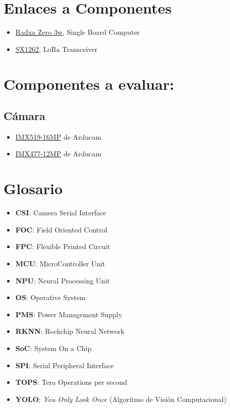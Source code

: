 \documentclass[letterpaper,11pt]{article}
\begin{document}
\newpage
\section*{Enlaces a Componentes}
\begin{itemize}
    \item \href{https://radxa.com/products/zeros/zero3w/#techspec}{Radxa Zero 3w}, Single Board Computer
    \item \href{https://www.semtech.com/products/wireless-rf/lora-connect/sx1262}{SX1262}, LoRa Transceiver
\end{itemize}

\section*{Componentes a evaluar:}
\subsection*{Cámara}
    \begin{itemize}
        \item \href{https://www.arducam.com/imx519-autofocus-camera-module-for-raspberry-pi-arducam-b0371.html}{IMX519-16MP} de Arducam
        \item \href{https://docs.arducam.com/Raspberry-Pi-Camera/Native-camera/12MP-IMX477/#supported-operating-systems}{IMX477-12MP} de Arducam
    \end{itemize}

\newpage
\section*{Glosario}
\begin{itemize}
    \item \textbf{CSI}: Camera Serial Interface
    \item \textbf{FOC}: Field Oriented Control
    \item \textbf{FPC}: Flexible Printed Circuit
    \item \textbf{MCU}: MicroController Unit
    \item \textbf{NPU}: Neural Processing Unit
    \item \textbf{OS}: Operative System
    \item \textbf{PMS}: Power Management Supply 
    \item \textbf{RKNN}: Rockchip Neural Network
    \item \textbf{SoC}: System On a Chip
    \item \textbf{SPI}: Serial Peripheral Interface
    \item \textbf{TOPS}: Tera Operations per second
    \item \textbf{YOLO}: \textit{You Only Look Once} (Algoritmo de Visión Computacional)
\end{itemize}
\end{document}
